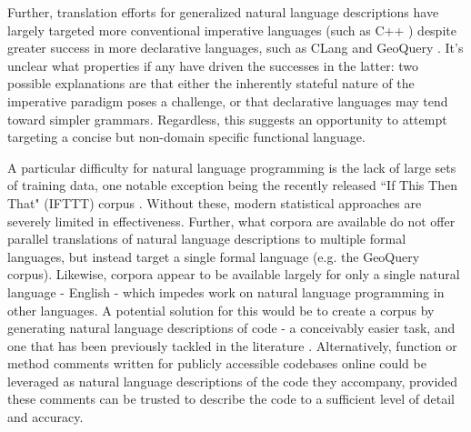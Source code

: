\documentclass[a4paper,11pt]{proposal}
\begin{document}
Further, translation efforts for generalized natural language descriptions have largely targeted more conventional imperative languages (such as C++ \cite{mou2015}) despite greater success in more declarative languages, such as CLang \cite{kate2005} and GeoQuery \cite{wong2006}. It's unclear what properties if any have driven the successes in the latter: two possible explanations are that either the inherently stateful nature of the imperative paradigm poses a challenge, or that declarative languages may tend toward simpler grammars. Regardless, this suggests an opportunity to attempt targeting a concise but non-domain specific functional language.

A particular difficulty for natural language programming is the lack of large sets of training data, one notable exception being the recently released ``If This Then That" (IFTTT) corpus \cite{quirk2015}. Without these, modern statistical approaches are severely limited in effectiveness. Further, what corpora are available do not offer parallel translations of natural language descriptions to multiple formal languages, but instead target a single formal language (e.g. the GeoQuery corpus). Likewise, corpora appear to be available largely for only a single natural language - English - which impedes work on natural language programming in other languages. A potential solution for this would be to create a corpus by generating natural language descriptions of code - a conceivably easier task, and one that has been previously tackled in the literature \cite{sridhara2010}. Alternatively, function or method comments written for publicly accessible codebases online could be leveraged as natural language descriptions of the code they accompany, provided these comments can be trusted to describe the code to a sufficient level of detail and accuracy.



\newpage


\end{document}
